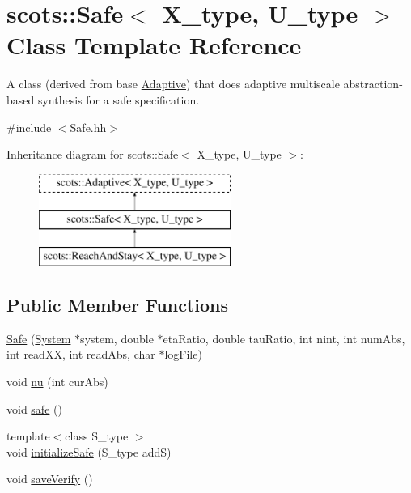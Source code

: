 \hypertarget{classscots_1_1Safe}{}\section{scots\+:\+:Safe$<$ X\+\_\+type, U\+\_\+type $>$ Class Template Reference}
\label{classscots_1_1Safe}


A class (derived from base \hyperlink{classscots_1_1Adaptive}{Adaptive}) that does adaptive multiscale abstraction-\/based synthesis for a safe specification.  




{\ttfamily \#include $<$Safe.\+hh$>$}

Inheritance diagram for scots\+:\+:Safe$<$ X\+\_\+type, U\+\_\+type $>$\+:\begin{figure}[H]
\begin{center}
\leavevmode
\includegraphics[height=3.000000cm]{classscots_1_1Safe}
\end{center}
\end{figure}
\subsection*{Public Member Functions}
\begin{DoxyCompactItemize}
\item 
\hyperlink{classscots_1_1Safe_ab2fd1008342b2ecccadceff25d349b6a}{Safe} (\hyperlink{classscots_1_1System}{System} $\ast$system, double $\ast$eta\+Ratio, double tau\+Ratio, int nint, int num\+Abs, int read\+XX, int read\+Abs, char $\ast$log\+File)
\item 
void \hyperlink{classscots_1_1Safe_ac9f2578f6b74602510ca5db4b2ef31b9}{nu} (int cur\+Abs)
\item 
void \hyperlink{classscots_1_1Safe_af5ea22ef6bd1f86dd1a6f7ef6e590492}{safe} ()
\item 
{\footnotesize template$<$class S\+\_\+type $>$ }\\void \hyperlink{classscots_1_1Safe_a8255c8172548f64907fedaddfcae9519}{initialize\+Safe} (S\+\_\+type addS)
\item 
void \hyperlink{classscots_1_1Safe_ab6866ae8860c91feb49467556f0a8598}{save\+Verify} ()
\end{DoxyCompactItemize}
